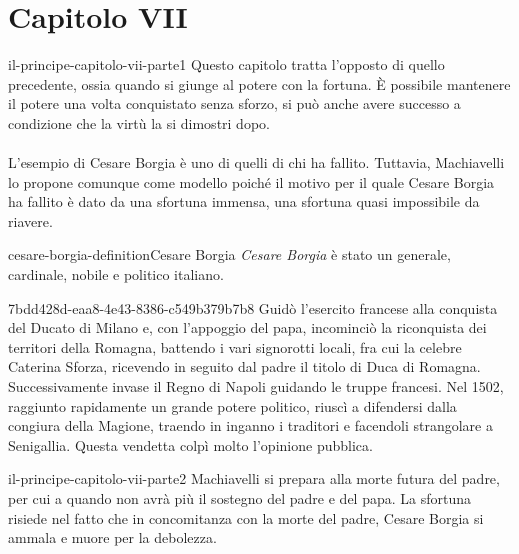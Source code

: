 \documentclass[preview]{standalone}
\begin{document}
\genpage

\section{Capitolo VII}

\begin{snippet}{il-principe-capitolo-vii-parte1}
    Questo capitolo tratta l'opposto di quello precedente, ossia quando si giunge al potere
    con la fortuna.
    È possibile mantenere il potere una volta conquistato senza sforzo, si può
    anche avere successo a condizione che la virtù la si dimostri dopo.
    \\\\
    L'esempio di Cesare Borgia è uno di quelli di chi ha fallito.
    Tuttavia, Machiavelli lo propone comunque come modello poiché
    il motivo per il quale Cesare Borgia ha fallito è dato da una sfortuna immensa,
    una sfortuna quasi impossibile da riavere.
\end{snippet}

\begin{snippetdefinition}{cesare-borgia-definition}{Cesare Borgia}
    \textit{Cesare Borgia} è stato un generale, cardinale, nobile e politico italiano.
\end{snippetdefinition}

\begin{snippetnote}{7bdd428d-eaa8-4e43-8386-c549b379b7b8}{}%
    Guidò l'esercito francese alla conquista del Ducato di Milano e,
    con l'appoggio del papa, incominciò la riconquista dei territori della Romagna,
    battendo i vari signorotti locali, fra cui la celebre Caterina Sforza,
    ricevendo in seguito dal padre il titolo di Duca di Romagna.
    Successivamente invase il Regno di Napoli guidando le truppe francesi.
    Nel 1502, raggiunto rapidamente un grande potere politico,
    riuscì a difendersi dalla congiura della Magione,
    traendo in inganno i traditori e facendoli strangolare a Senigallia.
    Questa vendetta colpì molto l'opinione pubblica.
\end{snippetnote}

\begin{snippet}{il-principe-capitolo-vii-parte2}
    Machiavelli si prepara alla morte futura del padre, per cui a quando
    non avrà più il sostegno del padre e del papa.
    La sfortuna risiede nel fatto che in concomitanza con la morte del padre,
    Cesare Borgia si ammala e muore per la debolezza.
\end{snippet}
\end{document}

